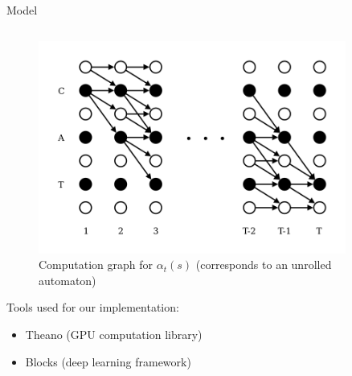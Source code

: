 \documentclass[final]{beamer}
\newlength{\sepwid}
\newlength{\onecolwid}
\newlength{\twocolwid}
\begin{document}
\begin{frame}[t]
\begin{columns}[t]
\begin{column}{\twocolwid}
\begin{block}{Model}
\begin{columns}[t,totalwidth=\twocolwid]
\begin{column}{\onecolwid}
\begin{figure}
\includegraphics[width=\linewidth]{azerty1.png}
\caption{Computation graph for $\alpha_t(s)$ (corresponds to an unrolled automaton)}
\end{figure}

Tools used for our implementation:
\begin{itemize}
\item Theano (GPU computation library)
\item Blocks (deep learning framework)
\end{itemize}


\end{column} %

\end{columns} %

\end{block}

\end{column} %



\begin{column}{\sepwid}\end{column} %




\begin{column}{\twocolwid} %


\end{column}
\end{columns}
\end{frame}
\end{document}
